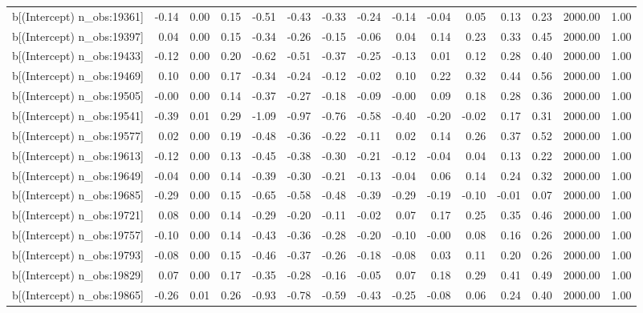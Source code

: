\begin{table}[ht]
\begin{tabular}{rrrrrrrrrrrrrrr}
  b[(Intercept) n\_obs:19361] & -0.14 & 0.00 & 0.15 & -0.51 & -0.43 & -0.33 & -0.24 & -0.14 & -0.04 & 0.05 & 0.13 & 0.23 & 2000.00 & 1.00 \\ 
  b[(Intercept) n\_obs:19397] & 0.04 & 0.00 & 0.15 & -0.34 & -0.26 & -0.15 & -0.06 & 0.04 & 0.14 & 0.23 & 0.33 & 0.45 & 2000.00 & 1.00 \\ 
  b[(Intercept) n\_obs:19433] & -0.12 & 0.00 & 0.20 & -0.62 & -0.51 & -0.37 & -0.25 & -0.13 & 0.01 & 0.12 & 0.28 & 0.40 & 2000.00 & 1.00 \\ 
  b[(Intercept) n\_obs:19469] & 0.10 & 0.00 & 0.17 & -0.34 & -0.24 & -0.12 & -0.02 & 0.10 & 0.22 & 0.32 & 0.44 & 0.56 & 2000.00 & 1.00 \\ 
  b[(Intercept) n\_obs:19505] & -0.00 & 0.00 & 0.14 & -0.37 & -0.27 & -0.18 & -0.09 & -0.00 & 0.09 & 0.18 & 0.28 & 0.36 & 2000.00 & 1.00 \\ 
  b[(Intercept) n\_obs:19541] & -0.39 & 0.01 & 0.29 & -1.09 & -0.97 & -0.76 & -0.58 & -0.40 & -0.20 & -0.02 & 0.17 & 0.31 & 2000.00 & 1.00 \\ 
  b[(Intercept) n\_obs:19577] & 0.02 & 0.00 & 0.19 & -0.48 & -0.36 & -0.22 & -0.11 & 0.02 & 0.14 & 0.26 & 0.37 & 0.52 & 2000.00 & 1.00 \\ 
  b[(Intercept) n\_obs:19613] & -0.12 & 0.00 & 0.13 & -0.45 & -0.38 & -0.30 & -0.21 & -0.12 & -0.04 & 0.04 & 0.13 & 0.22 & 2000.00 & 1.00 \\ 
  b[(Intercept) n\_obs:19649] & -0.04 & 0.00 & 0.14 & -0.39 & -0.30 & -0.21 & -0.13 & -0.04 & 0.06 & 0.14 & 0.24 & 0.32 & 2000.00 & 1.00 \\ 
  b[(Intercept) n\_obs:19685] & -0.29 & 0.00 & 0.15 & -0.65 & -0.58 & -0.48 & -0.39 & -0.29 & -0.19 & -0.10 & -0.01 & 0.07 & 2000.00 & 1.00 \\ 
  b[(Intercept) n\_obs:19721] & 0.08 & 0.00 & 0.14 & -0.29 & -0.20 & -0.11 & -0.02 & 0.07 & 0.17 & 0.25 & 0.35 & 0.46 & 2000.00 & 1.00 \\ 
  b[(Intercept) n\_obs:19757] & -0.10 & 0.00 & 0.14 & -0.43 & -0.36 & -0.28 & -0.20 & -0.10 & -0.00 & 0.08 & 0.16 & 0.26 & 2000.00 & 1.00 \\ 
  b[(Intercept) n\_obs:19793] & -0.08 & 0.00 & 0.15 & -0.46 & -0.37 & -0.26 & -0.18 & -0.08 & 0.03 & 0.11 & 0.20 & 0.26 & 2000.00 & 1.00 \\ 
  b[(Intercept) n\_obs:19829] & 0.07 & 0.00 & 0.17 & -0.35 & -0.28 & -0.16 & -0.05 & 0.07 & 0.18 & 0.29 & 0.41 & 0.49 & 2000.00 & 1.00 \\ 
  b[(Intercept) n\_obs:19865] & -0.26 & 0.01 & 0.26 & -0.93 & -0.78 & -0.59 & -0.43 & -0.25 & -0.08 & 0.06 & 0.24 & 0.40 & 2000.00 & 1.00 \\ 

\end{tabular}
\end{table}
